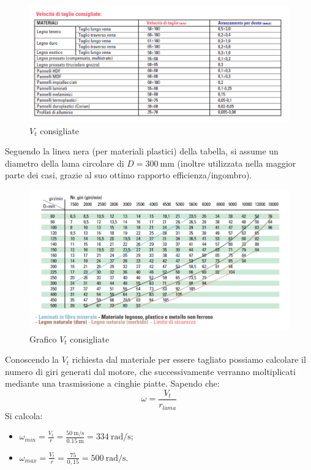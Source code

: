 \documentclass{report}
\begin{document}
\begin{figure}[H]
    \centering
    \includegraphics[width = 1\textwidth]{src/img/Vtaglio_lama.png}
    \caption{$V_t$ consigliate}
    \label{fig:vtcons}
\end{figure}

Seguendo la linea nera (per materiali plastici) della tabella, si assume un diametro della lama circolare di $D=\SI{300}{\mm}$ (inoltre utilizzata nella maggior parte dei casi, grazie al suo ottimo rapporto efficienza/ingombro).

\begin{figure}[H]
    \centering
    \includegraphics[width = 1\textwidth]{src/img/Vtaglio_lama_grafico.png}
    \caption{Grafico $V_t$ consigliate}
    \label{fig:grafvtcons}
\end{figure}

Conoscendo la $V_t$ richiesta dal materiale per essere tagliato possiamo calcolare il numero di giri generati dal motore, che successivamente verranno moltiplicati mediante una trasmissione a cinghie piatte.
Sapendo che:
\begin{equation}
  \omega=\frac{V_t}{r_{lama}}
\end{equation}
Si calcola:
\begin{itemize}
\item $\omega_{min} = \frac{V_t}{r} = \frac{\SI{50}{\m\per\s}}{\SI{0,15}{\m}} = \SI{334}{\radian\per\s} $;
\item $\omega_{max}  = \frac{V_t}{r}= \frac{75}{0,15} = \SI{500}{\radian\per\s}$.
\end{itemize}
\end{document}
